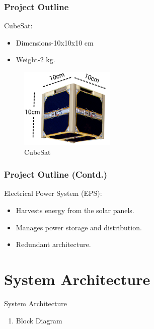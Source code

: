 \documentclass[aspectratio=169]{beamer}
\begin{document}
\begin{frame}
	\frametitle{Project Outline	}

	\begin{minipage}{0.5\textwidth}
	CubeSat:
\begin{itemize}
	
	\item Dimensions-10x10x10 cm 
	\item Weight-2 kg.
\end{itemize}
\end{minipage}
\begin{minipage}{0.3\textwidth}
		\begin{figure}
	\includegraphics[width=4.5cm]{cubes1.png}
	\begin{center}
		\caption{CubeSat}
	\end{center}
	\label{fig:trac2}
	
\end{figure}
	
\end{minipage}

	 \end{frame}


\begin{frame}
	\frametitle{Project Outline (Contd.)}
 	Electrical Power System (EPS):
 	\begin{itemize}
 		
 		\item Harvests energy from the solar panels.
 		\item Manages power storage and distribution.
 		\item Redundant architecture.
 	\end{itemize}
\end{frame}


\section{System Architecture}
\begin{frame}{System Architecture}
	
	
	\begin{enumerate}
		\item Block Diagram
	\end{enumerate}
	
	
\end{frame}
\end{document}
